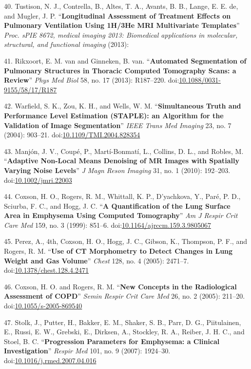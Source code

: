 \documentclass[11pt,]{article}
\begin{document}
40. Tustison, N. J., Contrella, B., Altes, T. A., Avants, B. B., Lange,
E. E. de, and Mugler, J. P. ``\textbf{Longitudinal Assessment of
Treatment Effects on Pulmonary Ventilation Using 1H/3He MRI Multivariate
Templates}'' \emph{Proc. sPIE 8672, medical imaging 2013: Biomedical
applications in molecular, structural, and functional imaging} (2013):

41. Rikxoort, E. M. van and Ginneken, B. van. ``\textbf{Automated
Segmentation of Pulmonary Structures in Thoracic Computed Tomography
Scans: a Review}'' \emph{Phys Med Biol} 58, no. 17 (2013): R187--220.
doi:\href{http://dx.doi.org/10.1088/0031-9155/58/17/R187}{10.1088/0031-9155/58/17/R187}

42. Warfield, S. K., Zou, K. H., and Wells, W. M. ``\textbf{Simultaneous
Truth and Performance Level Estimation (STAPLE): an Algorithm for the
Validation of Image Segmentation}'' \emph{IEEE Trans Med Imaging} 23,
no. 7 (2004): 903--21.
doi:\href{http://dx.doi.org/10.1109/TMI.2004.828354}{10.1109/TMI.2004.828354}

43. Manj{ó}n, J. V., Coup{é}, P., Mart{í}-Bonmat{í}, L., Collins, D. L.,
and Robles, M. ``\textbf{Adaptive Non-Local Means Denoising of MR Images
with Spatially Varying Noise Levels}'' \emph{J Magn Reson Imaging} 31,
no. 1 (2010): 192--203.
doi:\href{http://dx.doi.org/10.1002/jmri.22003}{10.1002/jmri.22003}

44. Coxson, H. O., Rogers, R. M., Whittall, K. P., D'yachkova, Y.,
Par{é}, P. D., Sciurba, F. C., and Hogg, J. C. ``\textbf{A
Quantification of the Lung Surface Area in Emphysema Using Computed
Tomography}'' \emph{Am J Respir Crit Care Med} 159, no. 3 (1999):
851--6.
doi:\href{http://dx.doi.org/10.1164/ajrccm.159.3.9805067}{10.1164/ajrccm.159.3.9805067}

45. Perez, A., 4th, Coxson, H. O., Hogg, J. C., Gibson, K., Thompson, P.
F., and Rogers, R. M. ``\textbf{Use of CT Morphometry to Detect Changes
in Lung Weight and Gas Volume}'' \emph{Chest} 128, no. 4 (2005):
2471--7.
doi:\href{http://dx.doi.org/10.1378/chest.128.4.2471}{10.1378/chest.128.4.2471}

46. Coxson, H. O. and Rogers, R. M. ``\textbf{New Concepts in the
Radiological Assessment of COPD}'' \emph{Semin Respir Crit Care Med} 26,
no. 2 (2005): 211--20.
doi:\href{http://dx.doi.org/10.1055/s-2005-869540}{10.1055/s-2005-869540}

47. Stolk, J., Putter, H., Bakker, E. M., Shaker, S. B., Parr, D. G.,
Piitulainen, E., Russi, E. W., Grebski, E., Dirksen, A., Stockley, R.
A., Reiber, J. H. C., and Stoel, B. C. ``\textbf{Progression Parameters
for Emphysema: a Clinical Investigation}'' \emph{Respir Med} 101, no. 9
(2007): 1924--30.
doi:\href{http://dx.doi.org/10.1016/j.rmed.2007.04.016}{10.1016/j.rmed.2007.04.016}
\end{document}
